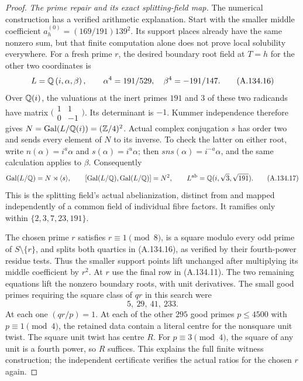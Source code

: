 \begin{proof}
\emph{The prime repair and its exact splitting-field map.}
The numerical construction has a verified
arithmetic explanation.
Start with the smaller middle coefficient
$a_h^{(0)}=(169/191)139^2$.
Its support places already have the same nonzero
sum, but that finite computation alone does not
prove local solubility everywhere.
For a fresh prime $r$, the desired boundary
root field at $T=h$ for the other two coordinates is
\[
 L=\mathbb Q\left(i,\alpha,\beta\right),\qquad
          \alpha^4=191/529,\quad \beta^4=-191/147.
\tag{A.134.16}
\]
Over $\mathbb Q(i)$, the valuations at the inert primes
$191$ and $3$ of these two radicands have matrix
$\bigl(\begin{smallmatrix}1&1\\0&-1\end{smallmatrix}\bigr)$.
Its determinant is $-1$.
Kummer independence therefore gives
$N=\operatorname{Gal}(L/\mathbb Q(i))=(\mathbb Z/4)^2$.
Actual complex conjugation $s$ has order two
and sends every element of $N$ to its inverse.
To check the latter on either root, write
$n(\alpha)=i^a\alpha$ and $s(\alpha)=i^u\alpha$;
then $sns(\alpha)=i^{-a}\alpha$, and the same
calculation applies to $\beta$.
Consequently
\[
 \operatorname{Gal}(L/\mathbb Q)=N\rtimes\langle s\rangle,\qquad
 [\operatorname{Gal}(L/\mathbb Q),\operatorname{Gal}(L/\mathbb Q)]=N^2,
 \qquad L^{\rm ab}=\mathbb Q(i,\sqrt3,\sqrt{191}).
\tag{A.134.17}
\]
This is the splitting field's actual abelianization,
distinct from and mapped independently of a
common field of individual fibre factors.
It ramifies only within $\{2,3,7,23,191\}$.

The chosen prime $r$ satisfies $r\equiv1\pmod8$,
is a square modulo every odd prime of
$S\setminus\{r\}$, and splits both quartics in
(A.134.16), as verified by their fourth-power
residue tests.
Thus the smaller support points lift unchanged
after multiplying its middle coefficient by $r^2$.
At $r$ use the final row in (A.134.11).
The two remaining equations lift the nonzero
boundary roots, with unit derivatives.
The small good primes requiring the square class
of $qr$ in this search were
\[
                             5,\ 29,\ 41,\ 233.
\tag{A.134.18}
\]
At each one $(qr/p)=1$.
At each of the other $295$ good primes
$p\le4500$ with $p\equiv1\pmod4$, the retained
data contain a literal centre for the nonsquare
unit twist.  The square unit twist has centre $R$.
For $p\equiv3\pmod4$, the square of any unit
is a fourth power, so $R$ suffices.
This explains the full finite witness construction;
the independent certificate verifies the actual
ratios for the chosen $r$ again.


\end{proof}
